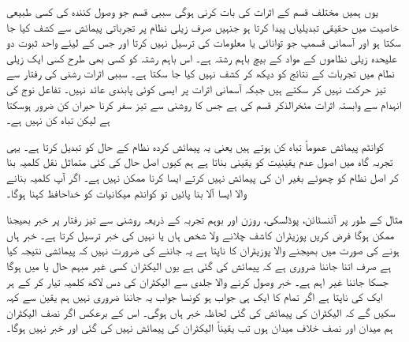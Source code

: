 یوں ہمیں مختلف قسم کے اثرات کی بات کرنی ہوگی سببی قسم جو وصول کنندہ کی کسی طبیعی خاصیت میں حقیقی تبدیلیاں پیدا کرتا ہو جنہیں صرف زیلی نظام پر تجرباتی پیمائش سے کشف کیا جا سکتا ہو اور آسمانی قسمپ جو توانائی یا معلومات کی ترسیل نہیں کرتا اور جس کے لیئے واحد ثبوت دو علیحدہ زیلی نظاموں کے مواد کے بیچ باہم رشتہ ہے۔ اس باہم رشتہ کو کسی بھی طرح کسی ایک زیلی نطام میں تجربات کے نتائج کو دیکھ کر کشف نہیں کیا جا سکتا ہے۔ سببی اثرات  رشنی کی رفتار سے تیز حرکت نہیں کر سکتے ہیں جبکہ آسمانی اثرات پر ایسی کوئی پابندی عائد نہیں۔ تفاعل نوج کی انہدام سے وابستہ اثرات مئخرالذکر قسم کی ہے جس کا روشنی سے تیز سفر کرنا حیران کن ضرور ہوسکتا ہے لیکن تباہ کن نہیں ہے۔

کوانٹم پیمائش عموماً تباہ کن ہوتے ہیں یعنی یہ پیمائش کردہ نظام کے حال کو تبدیل کرتا ہے۔ یہی تجربہ گاہ میں اصول عدم یقینیت کو یقینی بناتا ہے ہم کیوں اصل حال کی کئی متماثل نقل کلمیہ بنا کر اصل نظام کو چھوئے بغیر ان کی پیمائش نہیں کرتے ایسا کرنا ممکن نہیں ہے۔ اگر آپ کلمیہ بنانے والا ایسا آلا بنا پائیں تو کوانٹم میکانیات کو خداحافظ کہنا ہوگا۔

مثال کے طور پر آئنسٹائن، پوڈلسکی، روزن اور بوہم تجربہ کے ذریعہ روشنی سے تیز رفتار پر خبر بھیجنا ممکن ہوگا فرض کریں پوزیٹران کاشف چلانے ولا شخص ہاں یا نہیں کی خبر ترسیل کرتا ہے۔ خبر ہاں ہونے کی صورت میں بھیجنے والا پوزیٹران کا  ناپتا ہے یہ جاننے کی ضرورت نہیں کہ پیمائشی نتیجہ کیا ہے صرف اتنا جاننا ضروری ہے کہ پیمائش کی گئی ہے یوں الیکٹران کسی غیر مبہم حال  یا  میں ہوگا جسکا جاننا غیر اہم ہے۔ خبر وصول کرنے والا جلدی سے الیکٹران کی دس لاکھ کلمیہ تیار کر کے ہر ایک کی  ناپتا ہے اگر تمام کا ایک ہی جواب ہو کونسا جواب یہ جاننا ضروری نہیں ہم یقین سے کہہ سکیں گے کہ الیکٹران کی پیمائش کی گئی لحاظہ خبر ہاں ہوگی۔ اس کے برعکس اگر نصف الیکٹران ہم میدان اور نصف خلاف میدان ہوں تب یقیناً الیکٹران کی پیمائش نہیں کی گئی اور خبر نہیں ہوگا۔

